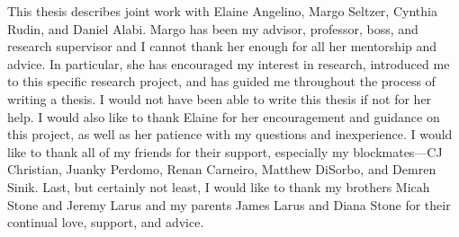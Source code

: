 
This thesis describes joint work with Elaine Angelino, Margo Seltzer, Cynthia Rudin, and Daniel Alabi.
Margo has been my advisor, professor, boss, and research supervisor and I cannot thank her enough for all her mentorship and advice.
In particular, she has encouraged my interest in research, introduced me to this specific research project, and has guided me throughout the process of writing a thesis.
I would not have been able to write this thesis if not for her help.
I would also like to thank Elaine for her encouragement and guidance on this project, as well as her patience with my questions and inexperience.
I would like to thank all of my friends for their support, especially my blockmates---CJ Christian, Juanky Perdomo, Renan Carneiro, Matthew DiSorbo, and Demren Sinik.
Last, but certainly not least, I would like to thank my brothers Micah Stone and Jeremy Larus and my parents James Larus and Diana Stone for their continual love, support, and advice.
